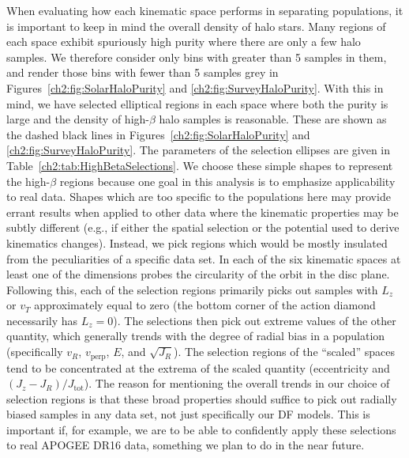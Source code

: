 When evaluating how each kinematic space performs in separating populations, it is important to keep in mind the overall density of halo stars. Many regions of each space exhibit spuriously high purity where there are only a few halo samples. We therefore consider only bins with greater than 5 samples in them, and render those bins with fewer than 5 samples grey in Figures~\ref{ch2:fig:SolarHaloPurity} and \ref{ch2:fig:SurveyHaloPurity}. With this in mind, we have selected elliptical regions in each space where both the purity is large and the density of high-$\beta$ halo samples is reasonable. These are shown as the dashed black lines in Figures~\ref{ch2:fig:SolarHaloPurity} and \ref{ch2:fig:SurveyHaloPurity}. The parameters of the selection ellipses are given in Table~\ref{ch2:tab:HighBetaSelections}. We choose these simple shapes to represent the high-$\beta$ regions because one goal in this analysis is to emphasize applicability to real data. Shapes which are too specific to the populations here may provide errant results when applied to other data where the kinematic properties may be subtly different (e.g., if either the spatial selection or the potential used to derive kinematics changes). Instead, we pick regions which would be mostly insulated from the peculiarities of a specific data set. In each of the six kinematic spaces at least one of the dimensions probes the circularity of the orbit in the disc plane. Following this, each of the selection regions primarily picks out samples with $L_{z}$ or $v_{T}$ approximately equal to zero (the bottom corner of the action diamond necessarily has $L_{z}=0$). The selections then pick out extreme values of the other quantity, which generally trends with the degree of radial bias in a population (specifically $v_{R}$, $v_\mathrm{perp}$, $E$, and $\sqrt{J_{R}}$). The selection regions of the ``scaled'' spaces tend to be concentrated at the extrema of the scaled quantity (eccentricity and $(J_{z}-J_{R})/J_\mathrm{tot}$). The reason for mentioning the overall trends in our choice of selection regions is that these broad properties should suffice to pick out radially biased samples in any data set, not just specifically our DF models. This is important if, for example, we are to be able to confidently apply these selections to real APOGEE DR16 data, something we plan to do in the near future. 


